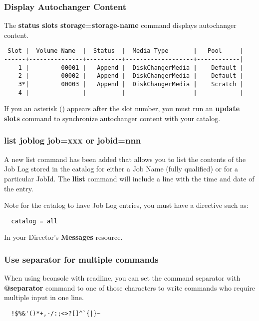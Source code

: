 \subsubsection{Display Autochanger Content}

The {\bf status slots storage=\lt{}storage-name\gt{}} command displays
autochanger content.

\footnotesize
\begin{verbatim}
 Slot |  Volume Name  |  Status  |  Media Type       |   Pool     |
------+---------------+----------+-------------------+------------|
    1 |         00001 |   Append |  DiskChangerMedia |    Default |
    2 |         00002 |   Append |  DiskChangerMedia |    Default |
    3*|         00003 |   Append |  DiskChangerMedia |    Scratch |
    4 |               |          |                   |            |
\end{verbatim}
\normalsize

If you an asterisk ({\bf *}) appears after the slot number, you must run an
{\bf update slots} command to synchronize autochanger content with your
catalog.

\subsubsection{list joblog job=xxx or jobid=nnn}
A new list command has been added that allows you to list the contents
of the Job Log stored in the catalog for either a Job Name (fully qualified)
or for a particular JobId.  The {\bf llist} command will include a line with
the time and date of the entry.

Note for the catalog to have Job Log entries, you must have a directive 
such as:

\begin{verbatim}
  catalog = all
\end{verbatim}

In your Director's {\bf Messages} resource.

\subsubsection{Use separator for multiple commands}
  When using bconsole with readline, you can set the command separator with 
  \textbf{@separator} command to one
  of those characters to write commands who require multiple input in one line.
\begin{verbatim}
  !$%&'()*+,-/:;<>?[]^`{|}~
\end{verbatim}

